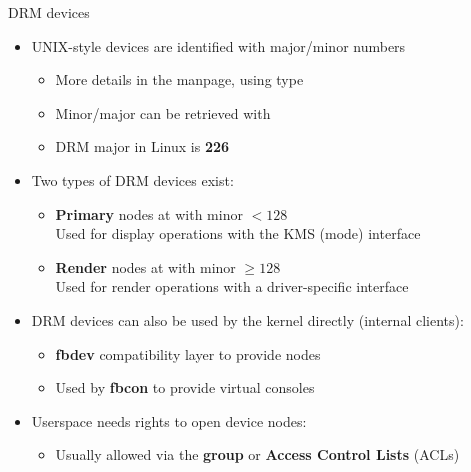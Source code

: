 \begin{frame}{DRM devices}
  \begin{itemize}
  \item UNIX-style devices are identified with major/minor numbers
    \begin{itemize}
    \item More details in the  manpage, using  type
    \item Minor/major can be retrieved with 
    \item DRM major in Linux is \textbf{226}
    \end{itemize}
  \item Two types of DRM devices exist:
    \begin{itemize}
    \item \textbf{Primary} nodes at  with minor \(< 128\)\\
    Used for display operations with the KMS (mode) interface
    \item \textbf{Render} nodes at  with minor \(\geq 128\)\\
    Used for render operations with a driver-specific interface
    \end{itemize}
  \item DRM devices can also be used by the kernel directly (internal clients):
    \begin{itemize}
    \item \textbf{fbdev} compatibility layer to provide  nodes
    \item Used by \textbf{fbcon} to provide virtual consoles
    \end{itemize}
  \item Userspace needs rights to open device nodes:
    \begin{itemize}
    \item Usually allowed via the  \textbf{group} or \textbf{Access Control Lists} (ACLs)
    \end{itemize}
  \end{itemize}
\end{frame}

